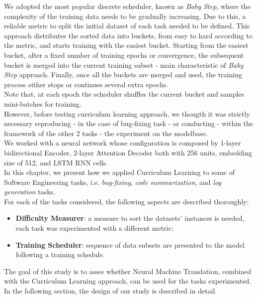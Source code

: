 We adopted the most popular discrete scheduler, known as \textit{Baby Step}, where the complexity of the training
data needs to be gradually increasing. Due to this, a reliable metric to split the initial dataset of each task needed to be defined.
This approach distributes the sorted data into buckets, from easy to hard according to the metric, and starts training with the easiest bucket. 
Starting from the easiest bucket, after a fixed number of training epochs or convergence, the subsequent bucket is merged
into the current training subset - main characteristic of \textit{Baby Step} approach.
Finally, once all the buckets are merged and used, the
training process either stops or continues several extra epochs.\\
Note that, at each epoch the scheduler shuffles the current bucket and samples mini-batches for training.\\

However, before testing curriculum learning approach, we thougth it was strictly necessary reproducing - in the case 
of bug-fixing task - or conducting -  within the framework of the other 2 tasks - the experiment on the modelbase.\\
We worked with a neural network whose configuration is composed by 1-layer bidirectional Encoder, 2-layer Attention 
Decoder both with 256 units, embedding size of 512, and LSTM RNN cells.\\

In this chapter, we present how we applied Curriculum Learning to some of Software
Engineering tasks, i.e. \textit{bug-fixing}, \textit{code summarization}, and \textit{log generation}
tasks. \\
For each of the tasks considered, the following aspects are described thoroughly:
\begin{itemize}
    \item \textbf{Difficulty Measurer}: a measure to sort the datasets' instances is needed, each task was experimented with a different metric; 
    \item \textbf{Training Scheduler}: sequence of data subsets are presented to the model following a training schedule.
\end{itemize}


The goal of this study is to asses whether Neural Machine Translation, combined with the Curriculum Learning approach, 
can be used for the tasks experimented. In the following section, the design of our study is described in detail.


